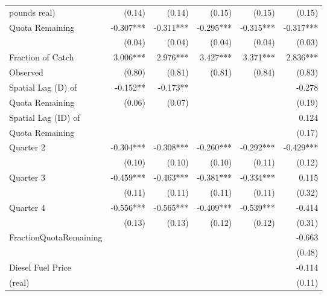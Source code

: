 {\begin{tabular}{l*{5}{r}}
pounds real)        &      (0.14)   &      (0.14)   &      (0.15)   &      (0.15)   &      (0.15)   \\
Quota Remaining     &      -0.307***&      -0.311***&      -0.295***&      -0.315***&      -0.317***\\
                    &      (0.04)   &      (0.04)   &      (0.04)   &      (0.04)   &      (0.03)   \\
Fraction of Catch   &       3.006***&       2.976***&       3.427***&       3.371***&       2.836***\\
Observed            &      (0.80)   &      (0.81)   &      (0.81)   &      (0.84)   &      (0.83)   \\
Spatial Lag (D) of  &      -0.152** &      -0.173** &               &               &      -0.278   \\
Quota Remaining     &      (0.06)   &      (0.07)   &               &               &      (0.19)   \\
Spatial Lag (ID) of &               &               &               &               &       0.124   \\
Quota Remaining     &               &               &               &               &      (0.17)   \\
Quarter 2           &      -0.304***&      -0.308***&      -0.260***&      -0.292***&      -0.429***\\
                    &      (0.10)   &      (0.10)   &      (0.10)   &      (0.11)   &      (0.12)   \\
Quarter 3           &      -0.459***&      -0.463***&      -0.381***&      -0.334***&       0.115   \\
                    &      (0.11)   &      (0.11)   &      (0.11)   &      (0.11)   &      (0.32)   \\
Quarter 4           &      -0.556***&      -0.565***&      -0.409***&      -0.539***&      -0.414   \\
                    &      (0.13)   &      (0.13)   &      (0.12)   &      (0.12)   &      (0.31)   \\
FractionQuotaRemaining&               &               &               &               &      -0.663   \\
                    &               &               &               &               &      (0.48)   \\
Diesel Fuel Price   &               &               &               &               &      -0.114   \\
(real)              &               &               &               &               &      (0.11)   \\

\end{tabular}}
